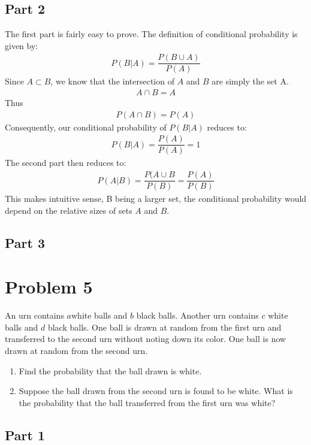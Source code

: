\documentclass{article}
\begin{document}
\subsection*{Part 2}
The first part is fairly easy to prove. The definition of conditional probability is given by:
\begin{align*}
P(B|A) = \dfrac{P(B\cup A)}{P(A)}
\end{align*}
Since $A \subset B$, we know that the intersection of $A$ and $B$ are simply the set A.
\begin{align*}
A\cap B = A
\end{align*}
Thus
\begin{align*}
P(A\cap B) = P(A)
\end{align*}
Consequently, our conditional probability of $P(B|A)$ reduces to:
\begin{align*}
\boxed{P(B|A) = \dfrac{P(A)}{P(A)} = 1}
\end{align*}
The second part then reduces to:
\begin{align*}
\boxed{P(A|B) = \dfrac{P(A\cup B}{P(B)}=\dfrac{P(A)}{P(B)}}
\end{align*}
This makes intuitive sense, B being a larger set, the conditional probability would depend on the relative sizes of sets $A$ and $B$.
\subsection*{Part 3}

\clearpage

\section*{Problem 5}
An urn contains $a$white balls and $b$ black balls. Another urn contains $c$ white balls and $d$ black balls. One ball is drawn at random from the first urn and transferred to the second urn without noting down its color. One ball is now drawn at random from the second urn.
%


\begin{enumerate}
    \item
    Find the probability that the ball drawn is white.
    \item
    Suppose the ball drawn from the second urn is found to be white. What is the probability that the ball transferred from the first urn was white?
    \end{enumerate}
\subsection*{Part 1}
\clearpage
\end{document}
